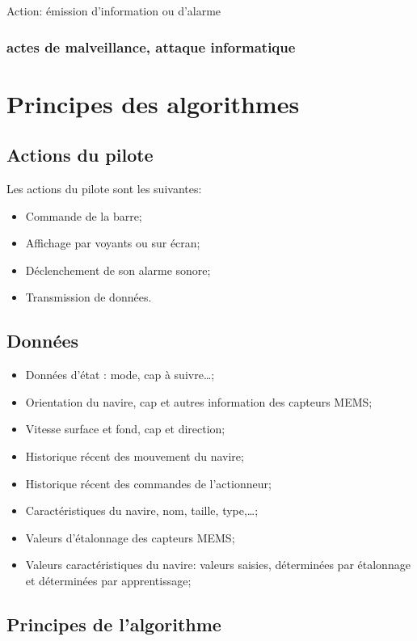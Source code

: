 \documentclass[a4paper,11pt]{report}
\begin{document}
Action: émission d'information ou d'alarme

\subsection{actes de malveillance, attaque informatique}



\chapter{Principes des algorithmes}

\section{Actions du pilote}
Les actions du pilote sont les suivantes:
\begin{itemize}
	\item Commande de la barre;
	\item Affichage par voyants ou sur écran;
	\item Déclenchement de son alarme sonore;
	\item Transmission de données.
\end{itemize}
\section{Données}

\begin{itemize}
	\item Données d'état : mode, cap à suivre\dots;
	\item Orientation du navire, cap et autres information des capteurs MEMS;
	\item Vitesse surface et fond, cap et direction;
	\item Historique récent des mouvement du navire;
	\item Historique récent des commandes de l'actionneur;
	\item Caractéristiques du navire, nom, taille, type,\dots;
	\item Valeurs d'étalonnage des capteurs MEMS;
	\item Valeurs caractéristiques du navire: valeurs saisies,
     	déterminées par étalonnage et déterminées par apprentissage; 
\end{itemize}


\section{Principes de l'algorithme}
\end{document}
